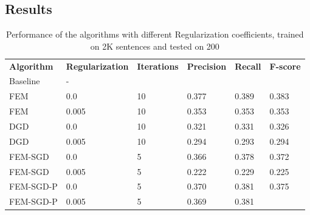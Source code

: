 \documentclass[11pt,letterpaper]{article}
\begin{document}
\subsection{Results}
\begin{table*}[t]
\begin{tabular}{llllll}
\textbf{Algorithm} & \textbf{Regularization} & \textbf{Iterations} & \textbf{Precision} & \textbf{Recall} & \textbf{F-score} \\
Baseline           & -                       &                     &                    &                 &                  \\
FEM                & 0.0                     & 10                  & 0.377              & 0.389           & 0.383            \\
FEM                & 0.005                   & 10                  & 0.353              & 0.353           & 0.353            \\
DGD                & 0.0                     & 10                  & 0.321              & 0.331           & 0.326            \\
DGD                & 0.005                   & 10                  & 0.294              & 0.293           & 0.294            \\
FEM-SGD            & 0.0                     & 5                   & 0.366              & 0.378           & 0.372            \\
FEM-SGD            & 0.005                   & 5                   & 0.222              & 0.229           & 0.225            \\
FEM-SGD-P   & 0.0                     & 5                   & 0.370              & 0.381           & 0.375            \\
FEM-SGD-P   & 0.005                   & 5                   & 0.369              & 0.381           &                 
\end{tabular}
\label{tab:rc}
\caption{Performance of the algorithms with different Regularization coefficients, trained on 2K sentences and tested on 200}
\end{table*}
\end{document}
